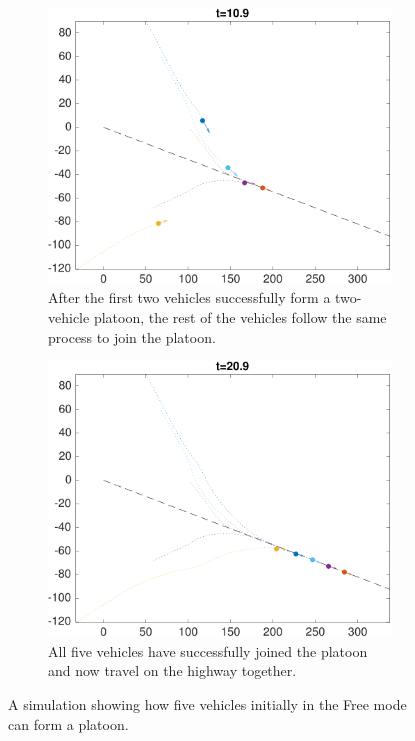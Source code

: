 \begin{figure}
    \begin{subfigure}[t]{0.23\textwidth} \label{subfig:fp_110}
        \includegraphics[width=\textwidth]{fig/fp_110}
        \caption{After the first two vehicles successfully form a two-vehicle platoon, the rest of the vehicles follow the same process to join the platoon.}
    \end{subfigure}
    \begin{subfigure}[t]{0.23\textwidth} \label{subfig:fp_210}
        \includegraphics[width=\textwidth]{fig/fp_210}
        \caption{All five vehicles have successfully joined the platoon and now travel on the highway together.}
    \end{subfigure}   
    \caption{A simulation showing how five vehicles initially in the Free mode can form a platoon. \label{fig:fp}}
\end{figure}

